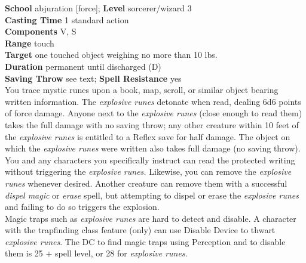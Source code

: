 \textbf{School} abjuration [force]; \textbf{Level} sorcerer/wizard 3\\
\textbf{Casting Time} 1 standard action\\
\textbf{Components} V, S\\
\textbf{Range} touch\\
\textbf{Target} one touched object weighing no more than 10 lbs.\\
\textbf{Duration} permanent until discharged (D)\\
\textbf{Saving Throw} see text; \textbf{Spell Resistance} yes\\
You trace mystic runes upon a book, map, scroll, or similar object bearing written information. The \textit{explosive runes }detonate when read, dealing 6d6 points of force damage. Anyone next to the \textit{explosive runes }(close enough to read them) takes the full damage with no saving throw; any other creature within 10 feet of the \textit{explosive runes }is entitled to a Reflex save for half damage. The object on which the \textit{explosive runes }were written also takes full damage (no saving throw).\\
You and any characters you specifically instruct can read the protected writing without triggering the \textit{explosive runes. }Likewise, you can remove the \textit{explosive runes }whenever desired. Another creature can remove them with a successful \textit{dispel magic }or \textit{erase }spell, but attempting to dispel or erase the \textit{explosive runes }and failing to do so triggers the explosion.\\
Magic traps such as \textit{explosive runes }are hard to detect and disable. A character with the trapfinding class feature (only) can use Disable Device to thwart \textit{explosive runes}. The DC to find magic traps using Perception and to disable them is 25 + spell level, or 28 for \textit{explosive runes}.\\
